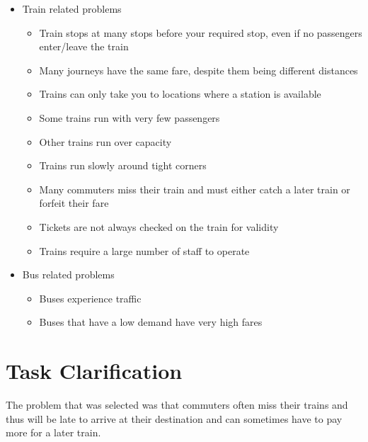 \documentclass[paper=a4, fontsize=12pt]{scrartcl} %
\numberwithin{equation}{section} %
\numberwithin{figure}{section} %
\numberwithin{table}{section} %
\begin{document}
        \begin{itemize}
            \item Train related problems
            \begin{itemize}
                \item Train stops at many stops before your required stop, even if no passengers enter/leave the train

                \item Many journeys have the same fare, despite them being different distances

                \item Trains can only take you to locations where a station is available

                \item Some trains run with very few passengers

                \item Other trains run over capacity

                \item Trains run slowly around tight corners

                \item Many commuters miss their train and must either catch a later train or forfeit their fare

                \item Tickets are not always checked on the train for validity

                \item Trains require a large number of staff to operate
            \end{itemize}

            \item Bus related problems
            \begin{itemize}
                \item Buses experience traffic

                \item Buses that have a low demand have very high fares
            \end{itemize}
        \end{itemize}

    \section{Task Clarification}

        The problem that was selected was that commuters often miss their trains and thus will be late to arrive at their destination and can sometimes have to pay more for a later train.\\
\end{document}
